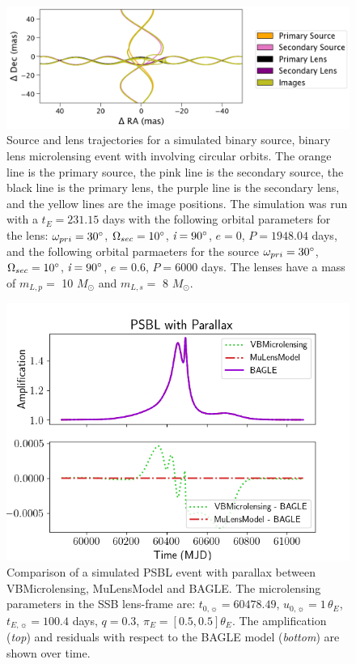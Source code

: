 \documentclass[twocolumn]{aastex701}
\newcommand{\tnot}{t_{0,\sun}}
\newcommand{\tE}{t_{E,\sun}}
\newcommand{\thetaE}{\theta_E}
\newcommand{\uo}{u_{0,\sun}}
\newcommand{\piE}{\pi_E}
\newcommand{\w}{\omega_{pri}}
\newcommand{\bigomega}{\Omega_{sec}}
\newcommand{\inclination}{\textit{i}}
\newcommand{\period}{\textit{P}}
\begin{document}
\begin{figure}
    \centering
    \includegraphics[width= \textwidth] {figures/bsbl_keplerian.png}
    \caption{Source and lens trajectories for a simulated binary source, binary lens microlensing event with  involving circular orbits. The orange line is the primary source, the pink line is the secondary source, the black line is the primary lens, the purple line is the secondary lens, and the yellow lines are the image positions. The simulation was run with a $t_E = 231.15$ days with the following orbital parameters for the lens: $\w = 30 \degree$, $\bigomega = 10 \degree$, $\inclination = 90 \degree$, $e=0$, $\period = 1948.04 $ days, and the following orbital parmaeters for the source $\w = 30 \degree$, $\bigomega = 10 \degree$, $\inclination = 90 \degree$, $e=0.6$, $\period = 6000 $ days. The lenses have a mass of $m_{L,p}=$ 10 $M_\odot$ and $m_{L,s}=$ 8 $M_\odot$.}
    \label{fig:bsbl_keplerian}
\end{figure}


\begin{figure}
    \centering
    \includegraphics[width= .48 \textwidth]{figures/parallax_comparison.png}
    \caption{Comparison of a simulated PSBL event with parallax between VBMicrolensing, MuLensModel and BAGLE. The microlensing parameters in the SSB lens-frame are: $\tnot = 60478.49$, $\uo=1 \,\thetaE$, $\tE = 100.4$ days, $q = 0.3$, $\piE = [0.5, 0.5] \thetaE$. The amplification  ({\em top}) and residuals with respect to the BAGLE model ({\em bottom}) are shown over time.}
    \label{fig:parallax_comparison}
\end{figure}
\end{document}
